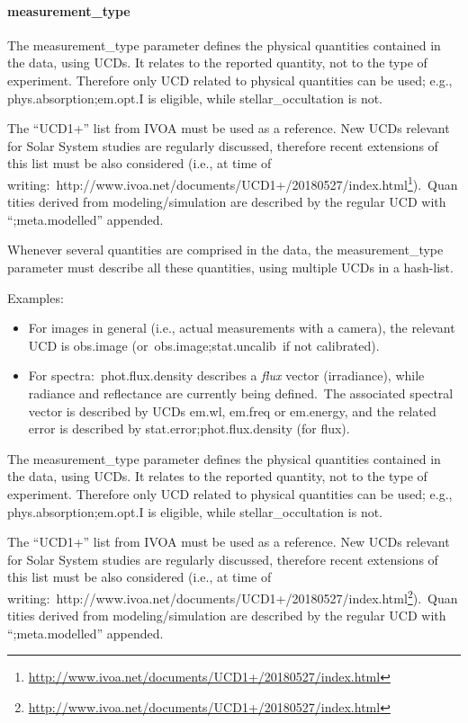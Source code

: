 \documentclass[11pt,a4paper]{ivoa}
\begin{document}
\paragraph{measurement\_type}

The measurement\_type parameter defines the physical quantities contained in the data, using UCDs. It relates to the reported quantity, not to the type of experiment. Therefore only UCD related to physical quantities can be used; e.g., phys.absorption;em.opt.I is eligible, while stellar\_occultation is not.

The ``UCD1+'' list from IVOA must be used as a reference. New UCDs relevant for Solar System studies are regularly discussed, therefore recent extensions of this list must be also considered (i.e., at time of writing: http://www.ivoa.net/documents/UCD1+/20180527/index.html\footnote{\url{http://www.ivoa.net/documents/UCD1+/20180527/index.html}}). Quantities derived from modeling/simulation are described by the regular UCD with ``;meta.modelled'' appended. 

Whenever several quantities are comprised in the data, the measurement\_type parameter must describe all these quantities, using multiple UCDs in a hash-list. 

Examples:

\begin{itemize}
\item For images in general (i.e., actual measurements with a camera), the relevant UCD is obs.image (or obs.image;stat.uncalib if not calibrated).
\item For spectra: phot.flux.density describes a \emph{flux} vector (irradiance), while radiance and reflectance are currently being defined. The associated spectral vector is described by UCDs em.wl, em.freq or em.energy, and the related error is described by stat.error;phot.flux.density (for flux).
\end{itemize}

The measurement\_type parameter defines the physical quantities contained in the data, using UCDs. It relates to the reported quantity, not to the type of experiment. Therefore only UCD related to physical quantities can be used; e.g., phys.absorption;em.opt.I is eligible, while stellar\_occultation is not.

The ``UCD1+'' list from IVOA must be used as a reference. New UCDs relevant for Solar System studies are regularly discussed, therefore recent extensions of this list must be also considered (i.e., at time of writing: http://www.ivoa.net/documents/UCD1+/20180527/index.html\footnote{\url{http://www.ivoa.net/documents/UCD1+/20180527/index.html}}). Quantities derived from modeling/simulation are described by the regular UCD with ``;meta.modelled'' appended. 
\end{document}
